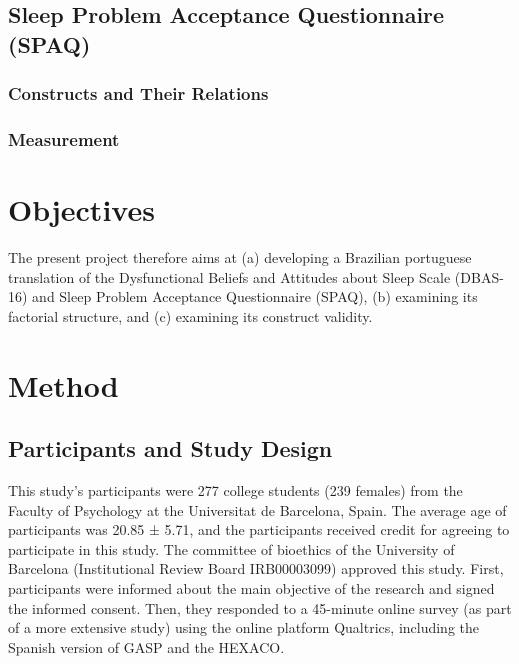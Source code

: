 \documentclass[
  ,doc,11pt, twoside,floatsintext]{apa6}
\begin{document}
\hypertarget{sleep-problem-acceptance-questionnaire-spaq}{%
\subsection{Sleep Problem Acceptance Questionnaire (SPAQ)}\label{sleep-problem-acceptance-questionnaire-spaq}}

\hypertarget{constructs-and-their-relations-1}{%
\subsubsection{Constructs and Their Relations}\label{constructs-and-their-relations-1}}

\hypertarget{measurement-1}{%
\subsubsection{Measurement}\label{measurement-1}}

\hypertarget{objectives}{%
\section{Objectives}\label{objectives}}

The present project therefore aims at (a) developing a Brazilian portuguese translation of the Dysfunctional Beliefs and Attitudes about Sleep Scale (DBAS-16) and Sleep Problem Acceptance Questionnaire (SPAQ), (b) examining its factorial structure, and (c) examining its construct validity.

\newpage

\hypertarget{method}{%
\section{Method}\label{method}}

\hypertarget{participants-and-study-design}{%
\subsection{Participants and Study Design}\label{participants-and-study-design}}

This study's participants were 277 college students (239 females) from the Faculty of Psychology at the Universitat de Barcelona, Spain. The average age of participants was 20.85 ± 5.71, and the participants received credit for agreeing to participate in this study. The committee of bioethics of the University of Barcelona (Institutional Review Board IRB00003099) approved this study. First, participants were informed about the main objective of the research and signed the informed consent. Then, they responded to a 45-minute online survey (as part of a more extensive study) using the online platform Qualtrics, including the Spanish version of GASP and the HEXACO.
\end{document}

